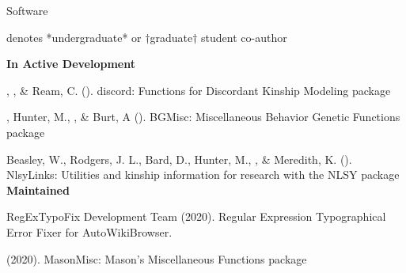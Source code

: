 \begin{rSection}{\textrm{Software}}%
\vspace{-1mm}\begin{center}\footnotesize{denotes *undergraduate* or $\dagger$graduate$\dagger$ student co-author}\end{center}\vspace{-5mm}

{\large \textbf {In Active Development}}%
\begin{etaremune}
\item\meb, \jt, \& Ream, C. (\the\year). discord: Functions for Discordant Kinship Modeling \R package 
%
\item\meb, Hunter, M., \jt, \& Burt, A (\the\year). BGMisc: Miscellaneous Behavior Genetic Functions \R package %
%
%
\item  Beasley, W., Rodgers, J. L., Bard, D., Hunter, M., \meb, \& Meredith, K. (\the\year). NlsyLinks: Utilities and kinship information for research with the NLSY \R package \smallskip\\
%
%
\hspace*{-8mm}\large{\bf{Maintained}}

\item RegExTypoFix Development Team (2020). Regular Expression Typographical Error Fixer for Auto\allowbreak WikiBrowser. 
%
\item\meb (2020). MasonMisc: Mason's Miscellaneous Functions \R package 
%
%
\end{etaremune}
\end{rSection}
